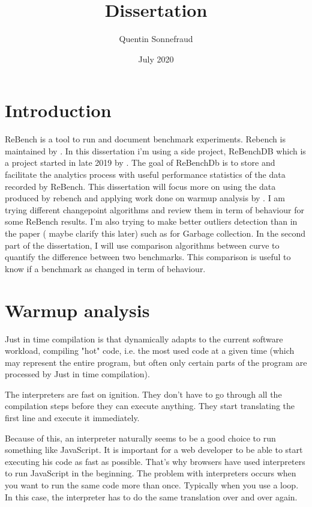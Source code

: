 \documentclass{article}
\title{Dissertation}
\author{Quentin Sonnefraud}
\date{July 2020}
\begin{document}
\maketitle

\tableofcontents


\section{Introduction}


ReBench is a tool to run and document benchmark experiments. Rebench is maintained by \cite{ReBench:2018}. In this dissertation i'm using a side project, ReBenchDB which is a project started in late 2019 by \cite{ReBench:2018}. The goal of ReBenchDb is to store and facilitate the analytics process with useful performance statistics of the data recorded by ReBench. This dissertation will focus more on using the data produced by rebench and applying work done on warmup analysis by \cite{barrett2017virtual}. I am trying different changepoint algorithms and review them in term of behaviour for some ReBench results. I'm also trying to make better outliers detection than in the paper ( maybe clarify this later) such as for Garbage collection.
In the second part of the dissertation, I will use comparison algorithms between curve to quantify the difference between two benchmarks. This comparison is useful to know if a benchmark as changed in term of behaviour.


\section{Warmup analysis}


Just in time compilation \cite{barrett2017virtual} is that dynamically adapts to the current software workload, compiling "hot" code, i.e. the most used code at a given time (which may represent the entire program, but often only certain parts of the program are processed by Just in time compilation).

The interpreters are fast on ignition. They don't have to go through all the compilation steps before they can execute anything. They start translating the first line and execute it immediately.

Because of this, an interpreter naturally seems to be a good choice to run something like JavaScript. It is important for a web developer to be able to start executing his code as fast as possible. That's why browsers have used interpreters to run JavaScript in the beginning.
The problem with interpreters occurs when you want to run the same code more than once. Typically when you use a loop. In this case, the interpreter has to do the same translation over and over again.
\end{document}

